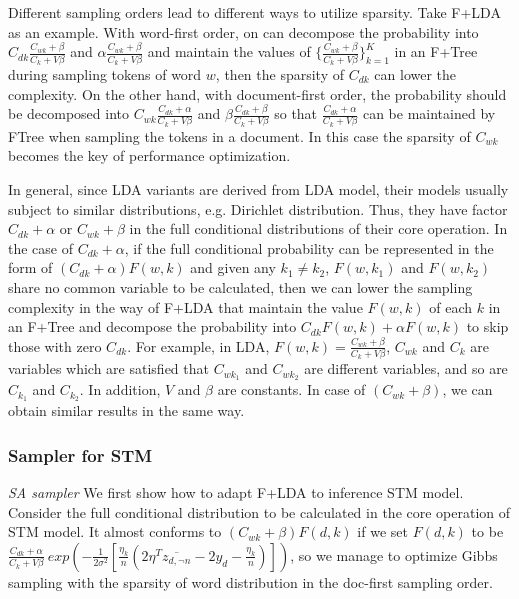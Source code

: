 \documentclass[10pt,journal,cspaper,compsoc]{IEEEtran}
\begin{document}
	Different sampling orders lead to different ways to utilize
	sparsity. Take F+LDA as an example. With word-first order, on can
	decompose the probability into $C_{dk} \frac{C_{wk} + \beta}{C_k + V\beta}$ and $\alpha \frac{C_{wk} + \beta}{C_k + V\beta}$ and maintain the values of $\{\frac{C_{wk} + \beta}{C_k + V\beta}\}_{k=1}^{K}$ in an F+Tree during sampling tokens of word $w$, then the sparsity of $C_{dk}$ can lower the complexity. On the other hand, with document-first order, the  probability should be decomposed into $C_{wk} \frac{C_{dk} + \alpha}{C_k + V\beta}$ and $\beta \frac{C_{dk} + \beta}{C_k + V\beta}$ so that $\frac{C_{dk} + \alpha}{C_k + V\beta}$ can  be maintained by FTree when sampling the tokens in a document. In this case the sparsity of $C_{wk}$ becomes the key of performance optimization.
	
	In general, since LDA variants are derived from LDA model, their models usually subject to similar distributions, e.g. Dirichlet distribution. Thus, they have factor $C_{dk}+\alpha$ or $C_{wk}+\beta$ in the full conditional distributions of their core operation.
	In the case of $C_{dk}+\alpha$, if the full conditional probability can be represented in the form of $(C_{dk}+\alpha)F(w,k)$  and given any $k_1 \not= k_2$, $F(w,k_1)$ and $F(w,k_2)$ share no common variable to be calculated, then we can lower the sampling complexity in the way of F+LDA that
	maintain the value $F(w,k)$ of each $k$ in an F+Tree and 
	decompose the probability into $C_{dk}F(w,k)+\alpha F(w,k)$ to skip those with zero $C_{dk}$.
	For example, in LDA,  $F(w,k)=\frac{C_{wk}+\beta}{C_k+V\beta}$, $C_{wk}$ and $C_k$ are variables which are satisfied that $C_{wk_1}$ and $C_{wk_2}$ are different variables, and so are $C_{k_1}$ and $C_{k_2}$. In addition, $V$ and $\beta$ are constants.
    In case of $(C_{wk}+\beta)$, we can obtain similar results in the same way.
	
	
	\subsubsection{Sampler for STM}
	
	\noindent
	{\large \em SA sampler} We first show how to adapt F+LDA to inference STM model. Consider the full conditional distribution to be calculated in the core operation of STM model. It almost conforms to $(C_{wk}+\beta)F(d,k)$ if we set 
	$F(d,k)$ to be $\frac{C_{dk}+\alpha}{C_{k}+V\beta}~
    exp(-\frac{1}{2\sigma^2}
    [\frac{\eta_k}{n}(2\eta^T\overline{z_{d,\neg n}}-2y_d-\frac{\eta_k}{n})])$, so we manage to optimize Gibbs sampling with the sparsity of word distribution in the doc-first sampling order. 
    
\end{document}

